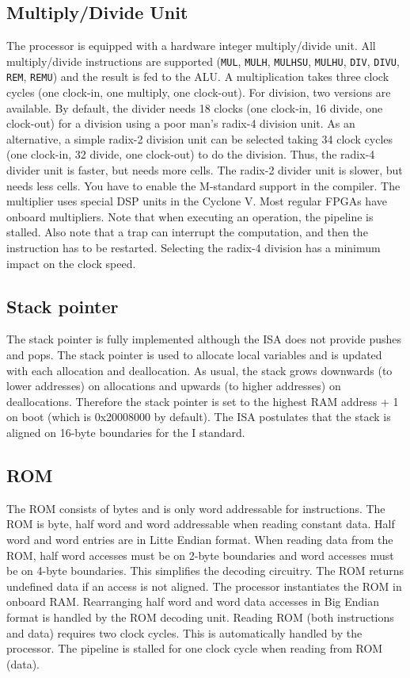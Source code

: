 \documentclass[12pt]{article}
\begin{document}
\subsection{Multiply/Divide Unit}
The processor is equipped with a hardware integer multiply/divide unit. All multiply/divide instructions are supported (\lstinline|MUL|, \lstinline|MULH|, \lstinline|MULHSU|, \lstinline|MULHU|, \lstinline|DIV|, \lstinline|DIVU|, \lstinline|REM|, \lstinline|REMU|) and the result is fed to the ALU. A multiplication takes three clock cycles (one clock-in, one multiply, one clock-out). For division, two versions are available. By default, the divider needs 18 clocks (one clock-in, 16 divide, one clock-out) for a division using a poor man's radix-4 division unit. As an alternative, a simple radix-2 division unit can be selected taking 34 clock cycles (one clock-in, 32 divide, one clock-out) to do the division.  Thus, the radix-4 divider unit is faster, but needs more cells. The radix-2 divider unit is slower, but needs less cells. You have to enable the M-standard support in the compiler. The multiplier uses special DSP units in the Cyclone V. Most regular FPGAs have onboard multipliers. Note that when executing an operation, the pipeline is stalled. Also note that a trap can interrupt the computation, and then the instruction has to be restarted. Selecting the radix-4 division has a minimum impact on the clock speed.


\subsection{Stack pointer}
The stack pointer is fully implemented although the ISA does not provide pushes and pops. The stack pointer is used to allocate local variables and is updated with each allocation and deallocation. As usual, the stack grows downwards (to lower addresses) on allocations and upwards (to higher addresses) on deallocations. Therefore the stack pointer is set to the highest RAM address + 1 on boot (which is 0x20008000 by default). The ISA postulates that the stack is aligned on 16-byte boundaries for the I standard.


\subsection{ROM}
\label{sec:rom}
The ROM consists of bytes and is only word addressable for instructions. The ROM is byte, half word and word addressable when reading constant data. Half word and word entries are in Litte Endian format. When reading data from the ROM, half word accesses must be on 2-byte boundaries and word accesses must be on 4-byte boundaries. This simplifies the decoding circuitry. The ROM returns undefined data if an access is not aligned. The processor instantiates the ROM in onboard RAM. Rearranging half word and word data accesses in Big Endian format is handled by the ROM decoding unit. Reading ROM (both instructions and data) requires two clock cycles.  This is automatically handled by the processor. The pipeline is stalled for one clock cycle when reading from ROM (data).
\end{document}
